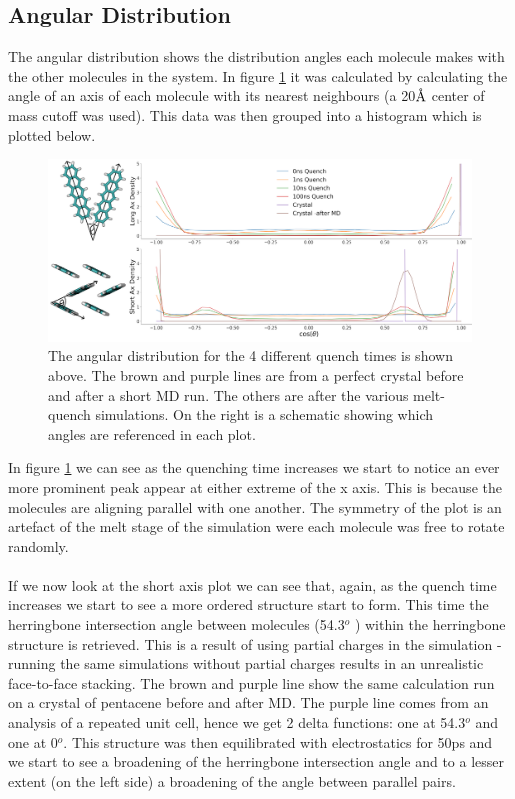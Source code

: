 \subsection{Angular Distribution}
\label{sect:ang_dist}
The angular distribution shows the distribution angles each molecule makes with the other molecules in the system. In figure \ref{fig:ang_dist} it was calculated by calculating the angle of an axis of each molecule with its nearest neighbours (a 20$\text{\normalfont\AA}$ center of mass cutoff was used). This data was then grouped into a histogram which is plotted below.
\begin{figure}[h]
	\includegraphics[width=\textwidth]{./img/DifferentQuenchTimes/AngularDist.png}
	\caption{\label{fig:ang_dist}
\noindent The angular distribution for the 4 different quench times is shown above. The brown and purple lines are from a perfect crystal before and after a short MD run. The others are after the various melt-quench simulations. On the right is a schematic showing which angles are referenced in each plot.}
\end{figure}
In figure \ref{fig:ang_dist} we can see as the quenching time increases we start to notice an ever more prominent peak appear at either extreme of the x axis. This is because the molecules are aligning parallel with one another. The symmetry of the plot is an artefact of the melt stage of the simulation were each molecule was free to rotate randomly.
\\\\
If we now look at the short axis plot we can see that, again, as the quench time increases we start to see a more ordered structure start to form. This time the herringbone intersection angle between molecules (54.3$^{o}$ \cite{PentaceneAngle}) within the herringbone structure is retrieved. This is a result of using partial charges in the simulation -running the same simulations without partial charges results in an unrealistic face-to-face stacking. The brown and purple line show the same calculation run on a crystal of pentacene before and after MD. The purple line comes from an analysis of a repeated unit cell, hence we get 2 delta functions: one at 54.3$^{o}$ and one at 0$^{o}$. This structure was then equilibrated with electrostatics for 50ps and we start to see a broadening of the herringbone intersection angle and to a lesser extent (on the left side) a broadening of the angle between parallel pairs.
